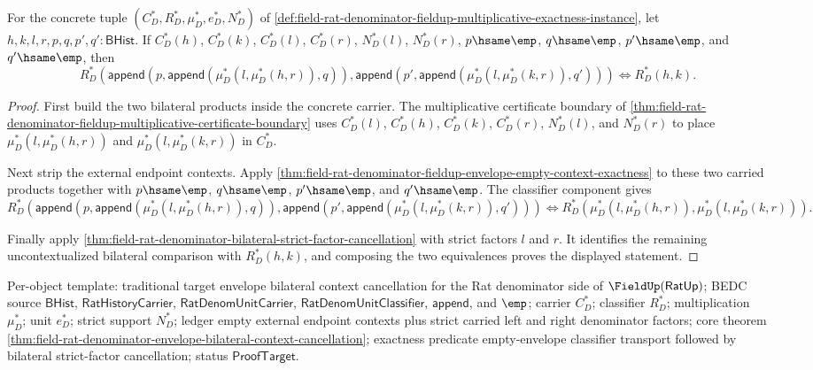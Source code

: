 
\begin{theorem}
\label{thm:field-rat-denominator-envelope-bilateral-context-cancellation}
For the concrete tuple
$(C_D^\ast,R_D^\ast,\mu_D^\ast,e_D^\ast,N_D^\ast)$ of
\autoref{def:field-rat-denominator-fieldup-multiplicative-exactness-instance},
let $h,k,l,r,p,q,p',q':\mathsf{BHist}$. If $C_D^\ast(h)$,
$C_D^\ast(k)$, $C_D^\ast(l)$, $C_D^\ast(r)$, $N_D^\ast(l)$,
$N_D^\ast(r)$, $p\hsame\emp$, $q\hsame\emp$, $p'\hsame\emp$, and
$q'\hsame\emp$, then
$$
R_D^\ast(\mathsf{append}(p,\mathsf{append}(\mu_D^\ast(l,\mu_D^\ast(h,r)),q)),
\mathsf{append}(p',\mathsf{append}(\mu_D^\ast(l,\mu_D^\ast(k,r)),q')))
\Longleftrightarrow R_D^\ast(h,k).
$$
\end{theorem}
\begin{proof}
First build the two bilateral products inside the concrete carrier. The
multiplicative certificate boundary of
\autoref{thm:field-rat-denominator-fieldup-multiplicative-certificate-boundary}
uses $C_D^\ast(l)$, $C_D^\ast(h)$, $C_D^\ast(k)$, $C_D^\ast(r)$,
$N_D^\ast(l)$, and $N_D^\ast(r)$ to place
$\mu_D^\ast(l,\mu_D^\ast(h,r))$ and
$\mu_D^\ast(l,\mu_D^\ast(k,r))$ in $C_D^\ast$.

Next strip the external endpoint contexts. Apply
\autoref{thm:field-rat-denominator-fieldup-envelope-empty-context-exactness} to
these two carried products together with $p\hsame\emp$, $q\hsame\emp$,
$p'\hsame\emp$, and $q'\hsame\emp$. The classifier component gives
$$
R_D^\ast(\mathsf{append}(p,\mathsf{append}(\mu_D^\ast(l,\mu_D^\ast(h,r)),q)),
\mathsf{append}(p',\mathsf{append}(\mu_D^\ast(l,\mu_D^\ast(k,r)),q')))
\Longleftrightarrow
R_D^\ast(\mu_D^\ast(l,\mu_D^\ast(h,r)),
\mu_D^\ast(l,\mu_D^\ast(k,r))).
$$

Finally apply
\autoref{thm:field-rat-denominator-bilateral-strict-factor-cancellation} with
strict factors $l$ and $r$. It identifies the remaining uncontextualized
bilateral comparison with $R_D^\ast(h,k)$, and composing the two equivalences
proves the displayed statement.
\end{proof}

Per-object template: traditional target envelope bilateral context cancellation
for the Rat denominator side of $\FieldUp(\mathsf{RatUp})$; BEDC source
$\mathsf{BHist}$, $\mathsf{RatHistoryCarrier}$,
$\mathsf{RatDenomUnitCarrier}$, $\mathsf{RatDenomUnitClassifier}$,
$\mathsf{append}$, and $\emp$; carrier $C_D^\ast$; classifier $R_D^\ast$;
multiplication $\mu_D^\ast$; unit $e_D^\ast$; strict support $N_D^\ast$;
ledger empty external endpoint contexts plus strict carried left and right
denominator factors; core theorem
\autoref{thm:field-rat-denominator-envelope-bilateral-context-cancellation};
exactness predicate empty-envelope classifier transport followed by bilateral
strict-factor cancellation; status $\mathsf{ProofTarget}$.
